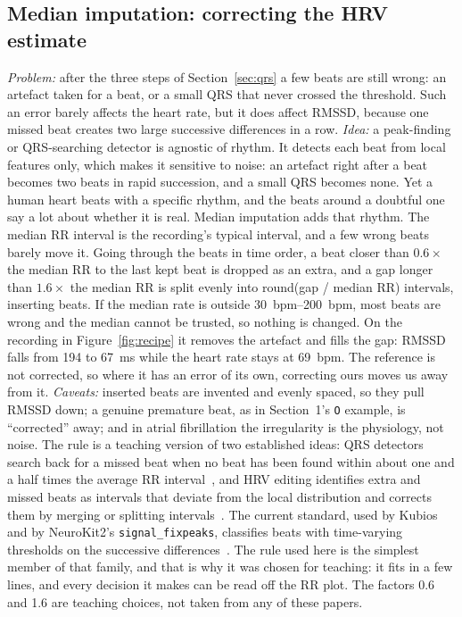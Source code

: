 \documentclass[12pt,article,oneside,linkcolour=blue]{oxengthesis}
\newcommand{\nb}[1]{\noindent{\small\textsf{Notebook: #1}}\par\nopagebreak\smallskip}
\begin{document}
\subsection{Median imputation: correcting the HRV estimate}
\label{sec:impute}
\nb{3.4, Task 4D}
\emph{Problem:} after the three steps of Section~\ref{sec:qrs} a few beats are still wrong: an
artefact taken for a beat, or a small QRS that never crossed the threshold. Such an error
barely affects the heart rate, but it does affect RMSSD, because one missed beat creates two
large successive differences in a row.
\emph{Idea:} a peak-finding or QRS-searching detector is agnostic of rhythm. It detects each
beat from local features only, which makes it sensitive to noise: an artefact right after a
beat becomes two beats in rapid succession, and a small QRS becomes none. Yet a human heart
beats with a specific rhythm, and the beats around a doubtful one say a lot about whether it is
real. Median imputation adds that rhythm. The median RR interval is the recording's
typical interval, and a few wrong beats barely move it. Going through the beats in time order,
a beat closer than $0.6\times$ the median RR to the last kept beat is dropped as an extra, and
a gap longer than $1.6\times$ the median RR is split evenly into round(gap / median RR)
intervals, inserting beats. If the median rate is outside \SIrange{30}{200}{bpm}, most beats are
wrong and the median cannot be trusted, so nothing is changed. On the recording in Figure~\ref{fig:recipe}
it removes the artefact and fills the gap: RMSSD falls from 194 to \SI{67}{\milli\second} while
the heart rate stays at \SI{69}{bpm}. The reference is not corrected, so where it has an error of its own, correcting
ours moves us away from it. \emph{Caveats:} inserted beats are invented and evenly
spaced, so they pull RMSSD down; a genuine premature beat, as in Section~1's \texttt{O}
example, is ``corrected'' away; and in atrial fibrillation the irregularity is the physiology,
not noise. The rule is a teaching version of two established ideas: QRS detectors search back
for a missed beat when no beat has been found within about one and a half times the average RR
interval~\cite{pan1985qrs, hamilton1986qrs}, and HRV editing identifies extra and missed beats
as intervals that deviate from the local distribution and corrects them by merging or splitting
intervals~\cite{berntson1990artifact}. The current standard, used by Kubios and by NeuroKit2's
\texttt{signal\_fixpeaks}, classifies beats with time-varying thresholds on the successive
differences~\cite{lipponen2019artefact}. The rule used here is the simplest member of that
family, and that is why it was chosen for teaching: it fits in a few lines, and every decision
it makes can be read off the RR plot. The factors 0.6 and 1.6 are teaching choices, not taken
from any of these papers.
\end{document}
